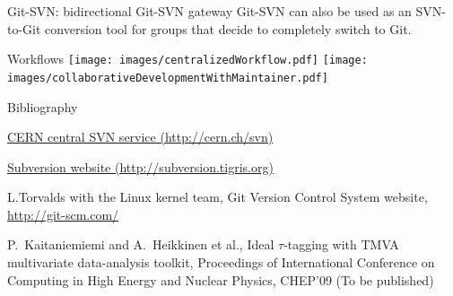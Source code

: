 \documentclass[final,hyperref={pdfpagelabels=false},notitlepage=true]{beamer}
\begin{document}
\begin{frame}{}
\begin{columns}[t]
\begin{column}{0.45\linewidth}
\begin{block}{\large Git-SVN: bidirectional Git-SVN gateway}
\vspace{1cm}
          Git-SVN can also be used as an SVN-to-Git conversion tool
          for groups that decide to completely switch to Git.
	\end{block}

\vspace{2cm}
        \begin{block}{\large Workflows}
    \vskip1cm
          \texttt{[image: images/centralizedWorkflow.pdf]}
          \texttt{[image: images/collaborativeDevelopmentWithMaintainer.pdf]}
        \end{block}

    \vskip2cm
\begin{block}{\large Bibliography}
    \vskip1cm
\begin{thebibliography}{9}
\href{http://cern.ch/svn}{CERN central SVN service (http://cern.ch/svn)}

\href{http://subversion.tigris.org}{Subversion website (http://subversion.tigris.org)}

L.Torvalds with the Linux kernel team,
Git Version Control System website,
\href{http://git-scm.com/}{http://git-scm.com/}


P.~Kaitaniemiemi and A.~Heikkinen et al.,
Ideal $\tau$-tagging with TMVA multivariate data-analysis toolkit,
Proceedings of International Conference on 
Computing in High Energy and Nuclear Physics, CHEP'09
(To be published)

\end{thebibliography}
\end{block}
    \vfill
    \end{column}
    \end{columns}
  \end{frame}
\end{document}
